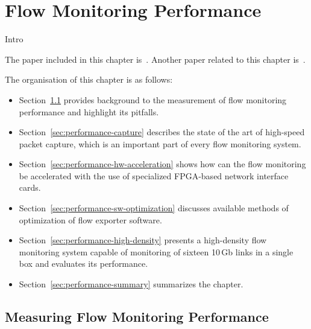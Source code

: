 \chapter{Flow Monitoring Performance}\label{chap:flow-monitoring-performance}

\begin{chapintro}

Intro

The paper included in this chapter is~\cite{Velan-2015-High}. Another paper related to this chapter is~\cite{Pus-2015-Hardware}.

The organisation of this chapter is as follows:
\begin{itemize}
  \item Section~\ref{sec:performance-measurement} provides background to the measurement of flow monitoring performance and highlight its pitfalls.
  \item Section~\ref{sec:performance-capture} describes the state of the art of high-speed packet capture, which is an important part of every flow monitoring system.
  \item Section~\ref{sec:performance-hw-acceleration} shows how can the flow monitoring be accelerated with the use of specialized FPGA-based network interface cards.
  \item Section~\ref{sec:performance-sw-optimization} discusses available methods of optimization of flow exporter software.
  \item Section~\ref{sec:performance-high-density} presents a high-density flow monitoring system capable of monitoring of sixteen 10\,Gb links in a single box and evaluates its performance.
  \item Section~\ref{sec:performance-summary} summarizes the chapter.
\end{itemize}

\end{chapintro}

\newpage


\section{Measuring Flow Monitoring Performance}\label{sec:performance-measurement}

